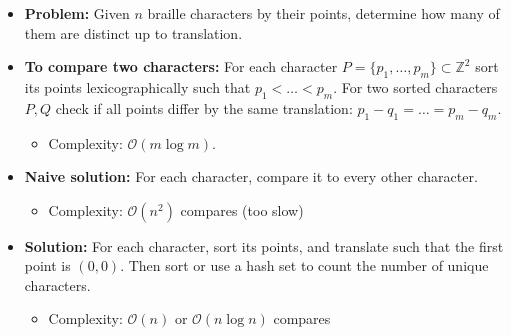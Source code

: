 \begin{frame}
    \frametitle{\problemtitle}
    \begin{itemize}
        \item<+-> \textbf{Problem:} Given $n$ braille characters by their points, determine how many of them are distinct up to translation.
        \item<+-> \textbf{To compare two characters:} For each character $P = \{p_1, \ldots, p_m\} \subset \mathbb{Z}^2$ sort its points lexicographically such that $p_1 < \ldots < p_m$. For two sorted characters $P,Q$ check if all points differ by the same translation: $p_1-q_1 = \ldots = p_m - q_m$.
        \begin{itemize}
            \item Complexity: $\mathcal O(m \log m)$.
        \end{itemize}
        \item<+-> \textbf{Naive solution:} For each character, compare it to every other character.
        \begin{itemize}
            \item Complexity: $\mathcal O(n^2)$ compares (too slow)
        \end{itemize}
        \item<+-> \textbf{Solution:} For each character, sort its points, and translate such that the first point is $(0,0)$. Then sort or use a hash set to count the number of unique characters.
        \begin{itemize}
            \item Complexity: $\mathcal O(n)$ or $\mathcal O(n \log n)$ compares
        \end{itemize}
    \end{itemize}
    \solvestats
\end{frame}
